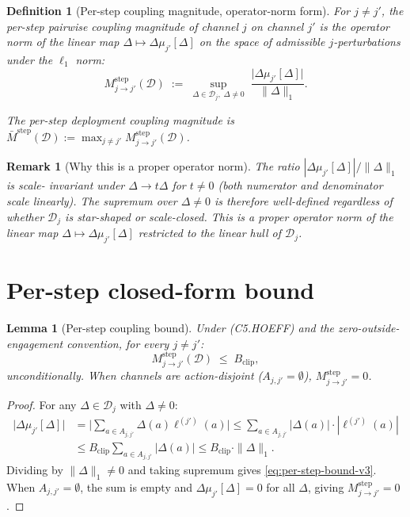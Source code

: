 \documentclass{article}
\newtheorem{definition}{Definition}
\newtheorem{lemma}{Lemma}
\newtheorem{remark}{Remark}
\newcommand{\Bclip}{B_{\mathrm{clip}}}
\begin{document}
\begin{definition}[Per-step coupling magnitude, operator-norm form]
\label{def:M-step-v3}
For $j \neq j'$, the \emph{per-step pairwise coupling magnitude}
of channel $j$ on channel $j'$ is the operator norm of the linear
map $\Delta \mapsto \Delta\mu_{j'}[\Delta]$ on the space of
admissible $j$-perturbations under the $\ell_1$ norm:
\begin{equation}
\label{eq:M-step-def-v3}
  M_{j \to j'}^{\mathrm{step}}(\mathcal{D})
  \;:=\; \sup_{\Delta \in \mathcal{D}_j,\; \Delta \neq 0}
  \;\frac{\big| \Delta\mu_{j'}[\Delta] \big|}{\|\Delta\|_1}.
\end{equation}

The \emph{per-step deployment coupling magnitude} is
$\bar{M}^{\mathrm{step}}(\mathcal{D}) := \max_{j \neq j'}
M_{j \to j'}^{\mathrm{step}}(\mathcal{D})$.
\end{definition}

\begin{remark}[Why this is a proper operator norm]
\label{rem:operator-norm}
The ratio $|\Delta\mu_{j'}[\Delta]| / \|\Delta\|_1$ is scale-
invariant under $\Delta \to t\Delta$ for $t \neq 0$ (both numerator
and denominator scale linearly).  The supremum over $\Delta \neq
0$ is therefore well-defined regardless of whether
$\mathcal{D}_j$ is star-shaped or scale-closed.  This is a proper
operator norm of the linear map $\Delta \mapsto \Delta\mu_{j'}[\Delta]$
restricted to the linear hull of $\mathcal{D}_j$.
\end{remark}

\section{Per-step closed-form bound}

\begin{lemma}[Per-step coupling bound]
\label{lem:per-step-v3}
Under (C5.HOEFF) and the zero-outside-engagement convention, for
every $j \neq j'$:
\begin{equation}
\label{eq:per-step-bound-v3}
  M_{j \to j'}^{\mathrm{step}}(\mathcal{D}) \;\leq\; \Bclip,
\end{equation}
unconditionally.  When channels are action-disjoint
($A_{j, j'} = \emptyset$), $M_{j \to j'}^{\mathrm{step}} = 0$.
\end{lemma}

\begin{proof}
For any $\Delta \in \mathcal{D}_j$ with $\Delta \neq 0$:
\begin{align*}
  \big| \Delta\mu_{j'}[\Delta] \big|
  &= \big| \sum_{a \in A_{j, j'}} \Delta(a) \ell^{(j')}(a) \big|
  \leq \sum_{a \in A_{j, j'}} |\Delta(a)| \cdot |\ell^{(j')}(a)|
  \\ &\leq \Bclip \sum_{a \in A_{j, j'}} |\Delta(a)|
  \leq \Bclip \cdot \|\Delta\|_1.
\end{align*}
Dividing by $\|\Delta\|_1 \neq 0$ and taking supremum gives
\eqref{eq:per-step-bound-v3}.  When $A_{j, j'} = \emptyset$, the
sum is empty and $\Delta\mu_{j'}[\Delta] = 0$ for all $\Delta$,
giving $M_{j \to j'}^{\mathrm{step}} = 0$.
\end{proof}
\end{document}
